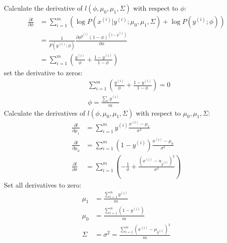 \begin{answer}
Calculate the derivative of $l(\phi, \mu_0, \mu_1, \Sigma)$ with respect to $\phi$:
\begin{align*}
    \frac{\partial l}{\partial \phi} &= \sum\limits_{i=1}^m (\log P(x^{(i)}|y^{(i)};\mu_0,\mu_1,\Sigma) + \log P(y^{(i)};\phi))\\
    &= \frac{1}{P(y^{(i)}; \phi)} \frac{\partial \phi^{y^{(i)}} (1 - \phi)^{(1 - y^{(i)})} }{\partial \phi}\\
    &= \sum\limits_{i=1}^m(\frac{y^{(i)}}{\phi} + \frac{1 - y^{(i)}}{1 - \phi})
\end{align*}
set the derivative to zeros:
\begin{align*}
    &\sum\limits_{i=1}^m(\frac{y^{(i)}}{\phi} + \frac{1 - y^{(i)}}{1 - \phi}) = 0\\
    &\phi = \frac{\sum\limits_i y^{(i)}}{m}
\end{align*}
Calculate the derivatives of $l(\phi, \mu_0, \mu_1, \Sigma)$ with respect to $\mu_0,\mu_1, \Sigma$:
\begin{align*}
    \frac{\partial l}{\partial \mu_1} &= \sum\limits_{i=1}^m y^{(i)} \frac{x^{(i)} - \mu_1}{\sigma^2}\\
    \frac{\partial l}{\partial \mu_0} &= \sum\limits_{i=1}^m (1 - y^{(i)}) \frac{x^{(i)} - \mu_0}{\sigma^2}\\
    \frac{\partial l}{\partial \sigma} &= \sum\limits_{i=1}^m (-\frac{1}{\sigma} + \frac{(x^{(i)} - u_{y^{(i)}})^2}{\sigma^3})
\end{align*}
Set all derivatives to zero:
\begin{align*}
    \mu_1 &= \frac{\sum\limits_{i=1}^m y^{(i)}}{m}\\
    \mu_0 &= \frac{\sum\limits_{i=1}^m (1 - y^{(i)})}{m}\\
    \Sigma &= \sigma^2 = \frac{\sum\limits_{i=1}^m (x^{(i)} - \mu_{y^{(i)}})^2}{m}
\end{align*}
\end{answer}
